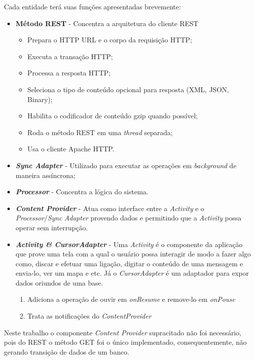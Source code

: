 \documentclass[12pt,a4paper,oneside]{report}
\begin{document}
Cada entidade terá suas funções apresentadas brevemente:
\begin{itemize}
    \item \textbf{Método REST} - Concentra a arquitetura do cliente REST
	\begin{itemize}
	    \item Prepara o HTTP URL e o corpo da requisição HTTP;
	    \item Executa a transação HTTP;
	    \item Processa a resposta HTTP;
	    \item Seleciona o tipo de conteúdo opcional para resposta (XML, JSON, Binary);
	    \item Habilita o codificador de conteúdo gzip quando possível;
	    \item Roda o método REST em uma \emph{thread} separada;
	    \item Usa o cliente Apache HTTP.
	\end{itemize}
    \item \textbf{\emph{Sync Adapter}} - Utilizado para executar as operações em \emph{background} de maneira assíncrona;
    \item \textbf{\emph{Processor}} - Concentra a lógica do sistema.
    \item \textbf{\emph{Content Provider}} - Atua como interface entre a \emph{Activity} e o \emph{Processor}/\emph{Sync Adapter} provendo dados e permitindo que a \emph{Activity} possa operar sem interrupção.
    \item \textbf{\emph{Activity \& CursorAdapter}} - Uma \emph{Activity} é o componente da aplicação que prove uma tela com a qual o usuário possa interagir de modo a fazer algo como, discar e efetuar uma ligação, digitar o conteúdo de uma mensagem e envia-lo, ver um mapa e etc. Já o \emph{CursorAdapter} é um adaptador para expor dados oriundos de uma base.
    \begin{enumerate}
	\item Adiciona a operação de ouvir em \emph{onResume} e remove-lo em \emph{onPouse}
	\item Trata as notificações do \emph{ContentProvider}
    \end{enumerate}

\end{itemize}

Neste trabalho o componente \emph{Content Provider} supracitado não foi necessário, pois do REST o método GET foi o único implementado, consequentemente, não gerando transição de dados de um banco.
\end{document}
